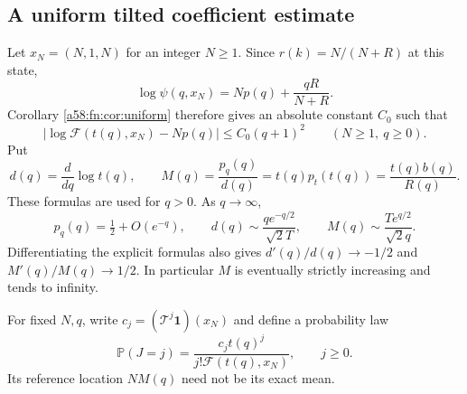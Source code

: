 \documentclass[11pt,letterpaper]{article}
\theoremstyle{remark}
\newcommand{\TT}{\mathcal T}
\newcommand{\FF}{\mathcal F}
\newcommand{\one}{\mathbf 1}
\newcommand{\Prb}{\mathbb P}
\begin{document}
\subsection{A uniform tilted coefficient estimate}
Let $x_N=(N,1,N)$ for an integer $N\ge1$. Since $r(k)=N/(N+R)$ at this state,
\[
 \log\psi(q,x_N)=Np(q)+\frac{qR}{N+R}.
\]
Corollary \ref{a58:fn:cor:uniform} therefore gives an absolute constant $C_0$ such that
\begin{equation}\label{a58:fn:eq:growing}
 \left|\log\FF(t(q),x_N)-Np(q)\right|\le C_0(q+1)^2
 \qquad(N\ge1,\ q\ge0).
\end{equation}
Put
\[
 d(q)=\frac{d}{dq}\log t(q),\qquad
 M(q)=\frac{p_q(q)}{d(q)}=t(q)p_t(t(q))=\frac{t(q)b(q)}{R(q)}.
\]
These formulas are used for $q>0$. As $q\to\infty$,
\begin{equation}\label{a58:fn:eq:Masympt}
 p_q(q)=\tfrac12+O(e^{-q}),\qquad
 d(q)\sim\frac{qe^{-q/2}}{\sqrt2T},\qquad
 M(q)\sim\frac{Te^{q/2}}{\sqrt2q}.
\end{equation}
Differentiating the explicit formulas also gives
$d'(q)/d(q)\to-1/2$ and $M'(q)/M(q)\to1/2$.
In particular $M$ is eventually strictly increasing and tends to infinity.

For fixed $N,q$, write $c_j=(\TT^j\one)(x_N)$ and define a probability law
\begin{equation}\label{a58:fn:eq:tilt}
 \Prb(J=j)=\frac{c_jt(q)^j}{j!\FF(t(q),x_N)},\qquad j\ge0.
\end{equation}
Its reference location $NM(q)$ need not be its exact mean.
\end{document}
